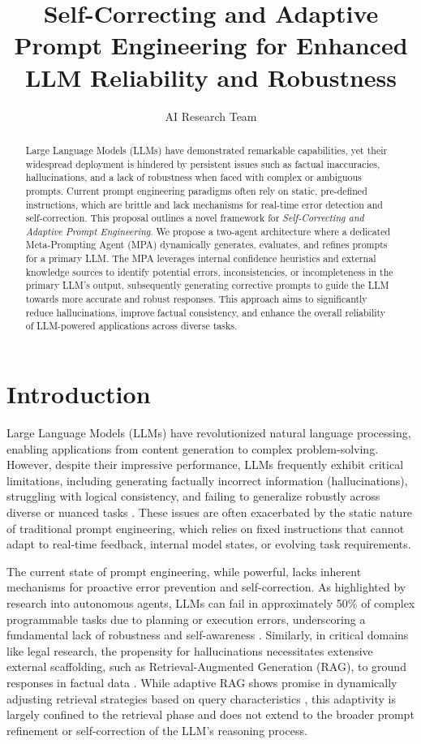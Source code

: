 \documentclass{article}
\title{Self-Correcting and Adaptive Prompt Engineering for Enhanced LLM Reliability and Robustness}
\author{AI Research Team}
\date{} %
\begin{document}
\maketitle

\begin{abstract}
Large Language Models (LLMs) have demonstrated remarkable capabilities, yet their widespread deployment is hindered by persistent issues such as factual inaccuracies, hallucinations, and a lack of robustness when faced with complex or ambiguous prompts. Current prompt engineering paradigms often rely on static, pre-defined instructions, which are brittle and lack mechanisms for real-time error detection and self-correction. This proposal outlines a novel framework for \textit{Self-Correcting and Adaptive Prompt Engineering}. We propose a two-agent architecture where a dedicated Meta-Prompting Agent (MPA) dynamically generates, evaluates, and refines prompts for a primary LLM. The MPA leverages internal confidence heuristics and external knowledge sources to identify potential errors, inconsistencies, or incompleteness in the primary LLM's output, subsequently generating corrective prompts to guide the LLM towards more accurate and robust responses. This approach aims to significantly reduce hallucinations, improve factual consistency, and enhance the overall reliability of LLM-powered applications across diverse tasks.
\end{abstract}

\section{Introduction}
Large Language Models (LLMs) have revolutionized natural language processing, enabling applications from content generation to complex problem-solving. However, despite their impressive performance, LLMs frequently exhibit critical limitations, including generating factually incorrect information (hallucinations), struggling with logical consistency, and failing to generalize robustly across diverse or nuanced tasks \cite{P1, P5}. These issues are often exacerbated by the static nature of traditional prompt engineering, which relies on fixed instructions that cannot adapt to real-time feedback, internal model states, or evolving task requirements.

The current state of prompt engineering, while powerful, lacks inherent mechanisms for proactive error prevention and self-correction. As highlighted by research into autonomous agents, LLMs can fail in approximately 50\% of complex programmable tasks due to planning or execution errors, underscoring a fundamental lack of robustness and self-awareness \cite{P1}. Similarly, in critical domains like legal research, the propensity for hallucinations necessitates extensive external scaffolding, such as Retrieval-Augmented Generation (RAG), to ground responses in factual data \cite{P5}. While adaptive RAG shows promise in dynamically adjusting retrieval strategies based on query characteristics \cite{P5}, this adaptivity is largely confined to the retrieval phase and does not extend to the broader prompt refinement or self-correction of the LLM's reasoning process.
\end{document}
